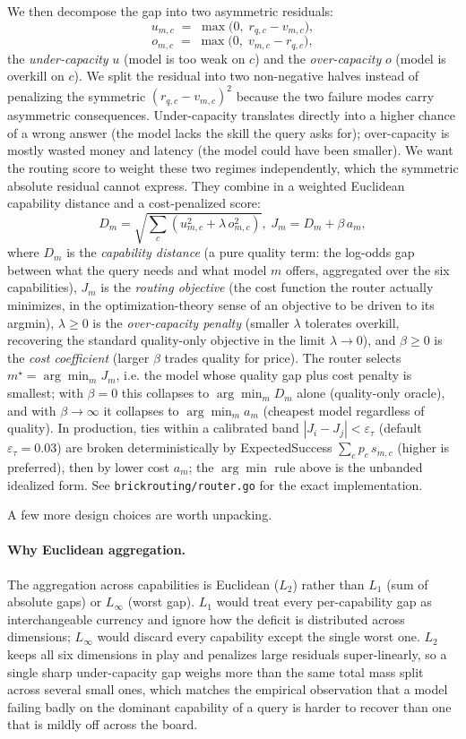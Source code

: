 \documentclass[twocolumn,10pt,a4paper]{article}
\begin{document}
We then decompose the gap into two asymmetric residuals:
\[
  u_{m,c} \;=\; \max\!\bigl(0,\; r_{q,c}-v_{m,c}\bigr),
\]
\[
  o_{m,c} \;=\; \max\!\bigl(0,\; v_{m,c}-r_{q,c}\bigr),
\]
the \emph{under-capacity} $u$ (model is too weak on $c$) and the \emph{over-capacity} $o$ (model is overkill on $c$). We split the residual into two non-negative halves instead of penalizing the symmetric $(r_{q,c}{-}v_{m,c})^2$ because the two failure modes carry asymmetric consequences. Under-capacity translates directly into a higher chance of a wrong answer (the model lacks the skill the query asks for); over-capacity is mostly wasted money and latency (the model could have been smaller). We want the routing score to weight these two regimes independently, which the symmetric absolute residual cannot express. They combine in a weighted Euclidean capability distance and a cost-penalized score:
\[
  D_m = \sqrt{\textstyle\sum_c\!\left(u_{m,c}^2 + \lambda\,o_{m,c}^2\right)},\;
  J_m = D_m + \beta\,a_m,
\]
where $D_m$ is the \emph{capability distance} (a pure quality term: the log-odds gap between what the query needs and what model $m$ offers, aggregated over the six capabilities), $J_m$ is the \emph{routing objective} (the cost function the router actually minimizes, in the optimization-theory sense of an objective to be driven to its argmin), $\lambda\!\ge\!0$ is the \emph{over-capacity penalty} (smaller $\lambda$ tolerates overkill, recovering the standard quality-only objective in the limit $\lambda{\to}0$), and $\beta\!\ge\!0$ is the \emph{cost coefficient} (larger $\beta$ trades quality for price). The router selects $m^{\star}{=}\arg\min_m J_m$, i.e. the model whose quality gap plus cost penalty is smallest; with $\beta{=}0$ this collapses to $\arg\min_m D_m$ alone (quality-only oracle), and with $\beta{\to}\infty$ it collapses to $\arg\min_m a_m$ (cheapest model regardless of quality). In production, ties within a calibrated band $|J_i{-}J_j|<\varepsilon_\tau$ (default $\varepsilon_\tau{=}0.03$) are broken deterministically by ExpectedSuccess $\sum_c p_c\,s_{m,c}$ (higher is preferred), then by lower cost $a_m$; the $\arg\min$ rule above is the unbanded idealized form. See \texttt{brickrouting/router.go} for the exact implementation.

A few more design choices are worth unpacking.

\paragraph{Why Euclidean aggregation.} The aggregation across capabilities is Euclidean ($L_2$) rather than $L_1$ (sum of absolute gaps) or $L_\infty$ (worst gap). $L_1$ would treat every per-capability gap as interchangeable currency and ignore how the deficit is distributed across dimensions; $L_\infty$ would discard every capability except the single worst one. $L_2$ keeps all six dimensions in play and penalizes large residuals super-linearly, so a single sharp under-capacity gap weighs more than the same total mass split across several small ones, which matches the empirical observation that a model failing badly on the dominant capability of a query is harder to recover than one that is mildly off across the board.
\end{document}
